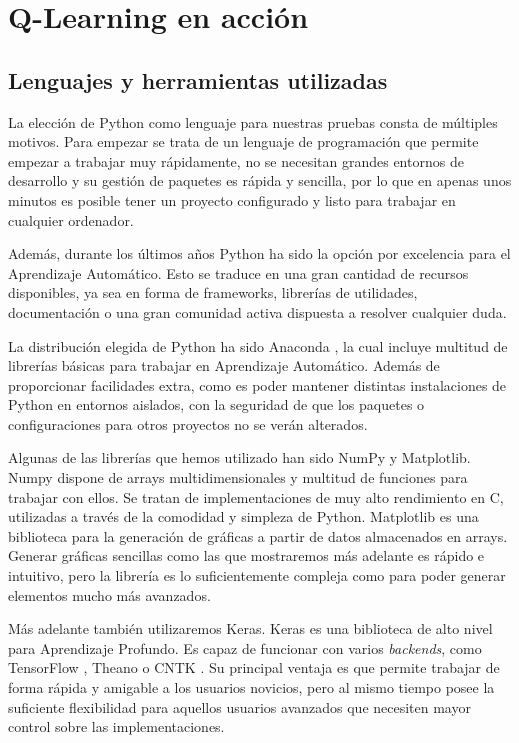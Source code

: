 \chapter{Q-Learning en acción}
\label{cap:q-learning}



\section{Lenguajes y herramientas utilizadas}

La elección de Python \citep{python} como lenguaje para nuestras pruebas consta de múltiples motivos. Para empezar se trata de un lenguaje de programación que permite empezar a trabajar muy rápidamente, no se necesitan grandes entornos de desarrollo y su gestión de paquetes es rápida y sencilla, por lo que en apenas unos minutos es posible tener un proyecto configurado y listo para trabajar en cualquier ordenador.

Además, durante los últimos años Python ha sido la opción por excelencia para el Aprendizaje Automático. Esto se traduce en una gran cantidad de recursos disponibles, ya sea en forma de frameworks, librerías de utilidades, documentación o una gran comunidad activa dispuesta a resolver cualquier duda.

La distribución elegida de Python ha sido Anaconda \citep{anaconda}, la cual incluye multitud de librerías básicas para trabajar en Aprendizaje Automático. Además de proporcionar facilidades extra, como es poder mantener distintas instalaciones de Python en entornos aislados, con la seguridad de que los paquetes o configuraciones para otros proyectos no se verán alterados.

Algunas de las librerías que hemos utilizado han sido NumPy y Matplotlib. Numpy \citet{numpy} dispone de arrays multidimensionales y multitud de funciones para trabajar con ellos. Se tratan de implementaciones de muy alto rendimiento en C, utilizadas a través de la comodidad y simpleza de Python. Matplotlib \citep{matplotlib} es una biblioteca para la generación de gráficas a partir de datos almacenados en arrays. Generar gráficas sencillas como las que mostraremos más adelante es rápido e intuitivo, pero la librería es lo suficientemente compleja como para poder generar elementos mucho más avanzados.

Más adelante también utilizaremos Keras. Keras \citep{chollet2015keras} es una biblioteca de alto nivel para Aprendizaje Profundo. Es capaz de funcionar con varios \textit{backends}, como TensorFlow \citep{tensorflow2015-whitepaper}, Theano \citep{2016arXiv160502688short} o CNTK \citep{Seide:2016:CMO:2939672.2945397}. Su principal ventaja es que permite trabajar de forma rápida y amigable a los usuarios novicios, pero al mismo tiempo posee la suficiente flexibilidad para aquellos usuarios avanzados que necesiten mayor control sobre las implementaciones.


